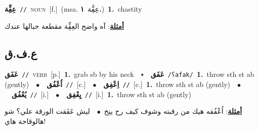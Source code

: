 \documentclass[10pt,a4paper,twoside]{article} %
\begin{document}
\begin{multicols}{2}
{\setlength\topsep{0pt}\textbf{\foreignlanguage{arabic}{عِفِِّة}}\ {\color{gray}\texttt{//}\color{black}}\ \textsc{noun}\ [f.]\ \color{gray}(msa. \foreignlanguage{arabic}{عِفَِّة}~\foreignlanguage{arabic}{\textbf{١.}})\color{black}\ \textbf{1.}~chastity\  \begin{flushright}\color{gray}\foreignlanguage{arabic}{\textbf{\underline{\foreignlanguage{arabic}{أمثلة}}}: آه واضح العِفِِّة مقطعة حبالها عندك}\end{flushright}\color{black}} \vspace{2mm}

\vspace{-3mm}
\subsection*{\color{blue}\foreignlanguage{arabic}{ع.ف.ق}\color{blue}{}} 

{\setlength\topsep{0pt}\textbf{\foreignlanguage{arabic}{عَفَق}}\ {\color{gray}\texttt{//}\color{black}}\ \textsc{verb}\ [p.]\ \textbf{1.}~grab sb by his neck\ \ $\smblkdiamond$\ \ \setlength\topsep{0pt}\textbf{\foreignlanguage{arabic}{عَفَق}}\ {\color{gray}\texttt{/ʕafak/}\color{black}}\ \textbf{1.}~throw sth st ab (gently)\ \ $\bullet$\ \ \setlength\topsep{0pt}\textbf{\foreignlanguage{arabic}{اُعْفُق}}\ {\color{gray}\texttt{//}\color{black}}\ [c.]\ \ $\bullet$\ \ \setlength\topsep{0pt}\textbf{\foreignlanguage{arabic}{اِعْفِق}}\ {\color{gray}\texttt{//}\color{black}}\ [c.]\ \textbf{1.}~throw sth st ab (gently)\ \ $\bullet$\ \ \setlength\topsep{0pt}\textbf{\foreignlanguage{arabic}{يُعْفُق}}\ {\color{gray}\texttt{//}\color{black}}\ [i.]\ \ $\bullet$\ \ \setlength\topsep{0pt}\textbf{\foreignlanguage{arabic}{يِعْفِق}}\ {\color{gray}\texttt{//}\color{black}}\ [i.]\ \textbf{1.}~throw sth st ab (gently)\  \begin{flushright}\color{gray}\foreignlanguage{arabic}{\textbf{\underline{\foreignlanguage{arabic}{أمثلة}}}: اُعْفُقه هيك من رقبته وشوف كيف رح ينِخ\ $\bullet$\ \  ليش عَفَقت الورقة علي؟ شو هالوقاحة هاي!}\end{flushright}\color{black}} \vspace{2mm}


\end{multicols}
\end{document}
